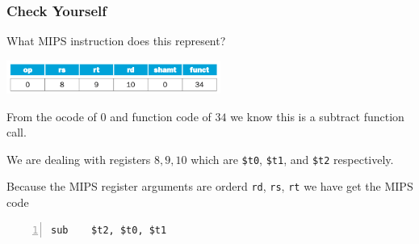 \documentclass[10pt]{article}
\begin{document}
\subsubsection{Check Yourself}
What MIPS instruction does this represent?
\begin{center}
\includegraphics[width=7cm]{15.png}
\end{center}
  \begin{tcolorbox}[%
    enhanced, 
    breakable,
    frame hidden,
    overlay broken = {
      (frame.north west) rectangle (frame.south east);},
    ]
    From the ocode of $0$ and function code of $34$ we know this is a subtract function call.

    We are dealing with registers $8,9,10$ which are \texttt{\$t0}, \texttt{\$t1}, and \texttt{\$t2} respectively.

    Because the MIPS register arguments are orderd \texttt{rd}, \texttt{rs}, \texttt{rt}  we have get the MIPS code
    \begin{lstlisting}[style=CStyle, numbers=left, xleftmargin=5.0ex, aboveskip=2em, belowskip=2em, numberstyle=\color{blue}, escapeinside=||]
sub    $t2, $t0, $t1
\end{lstlisting}

  \end{tcolorbox}
\end{document}
